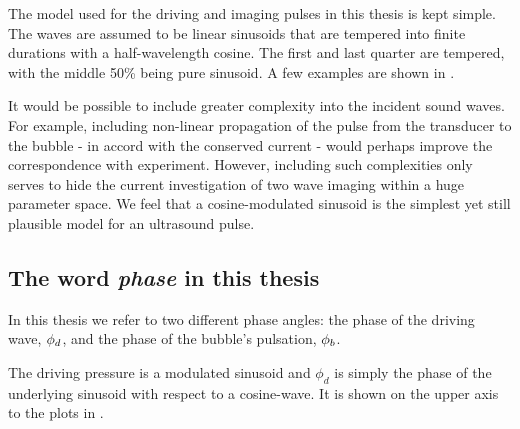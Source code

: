 The model used for the  driving and imaging pulses in this thesis is kept simple.
The waves are assumed to be linear sinusoids that are tempered
into finite durations with a half-wavelength cosine.
The first and last quarter are tempered,
with the middle 50\% being pure sinusoid.
A few examples are shown in .



It would be possible to include greater complexity into the incident sound waves.
For example, including non-linear propagation of the pulse from the transducer to the bubble - in accord with the conserved current -
would perhaps improve the correspondence with experiment.
However, including such complexities only serves to  hide the current investigation of two wave imaging 
within a huge parameter space.
We feel that a cosine-modulated sinusoid
is the simplest yet still plausible model for an ultrasound pulse.

\subsection{The word {\em phase} in this thesis}\label{sec:comp:phase}


In this thesis we refer to two different phase angles:
the phase of the driving wave, ${\phi_d}$, and the phase of the bubble's pulsation, ${\phi_b}$.

The driving pressure is a modulated sinusoid  and $\phi_d$ is simply the phase of the underlying sinusoid
with respect to a cosine-wave.
It is shown on the upper axis to the plots in .




